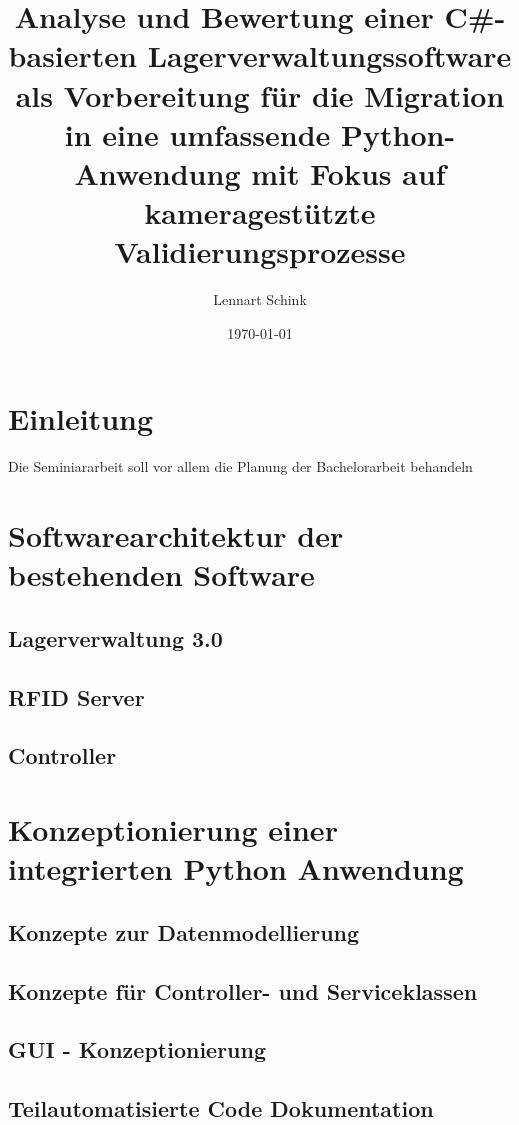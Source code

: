 \documentclass[11pt]{article}
\title {Analyse und Bewertung einer C\#-basierten Lagerverwaltungssoftware als Vorbereitung für die Migration in eine umfassende Python-Anwendung mit Fokus auf kameragestützte Validierungsprozesse}
\author{Lennart Schink}
\date{\today}
\begin{document}
    \maketitle
    \tableofcontents
    \newpage

    \section{Einleitung}
    Die Seminiararbeit soll vor allem die Planung der Bachelorarbeit behandeln

    \newpage
    \section {Softwarearchitektur der bestehenden Software}

    \subsection {Lagerverwaltung 3.0}

    \subsection {RFID Server}

    \subsection {Controller}

    \newpage
    \section {Konzeptionierung einer integrierten Python Anwendung}

    \subsection {Konzepte zur Datenmodellierung}

    \subsection {Konzepte für Controller- und Serviceklassen}

    \subsection {GUI - Konzeptionierung}

    \subsection {Teilautomatisierte Code Dokumentation}
\end{document}
